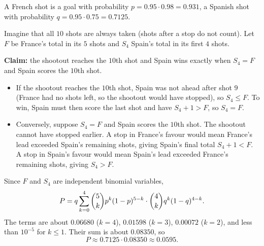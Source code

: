 A French shot is a goal with probability $p=0.95\cdot0.98=0.931$, a Spanish shot with probability $q=0.95\cdot0.75=0.7125$.

Imagine that all $10$ shots are always taken (shots after a stop do not count). Let $F$ be France's total in its $5$ shots and $S_4$ Spain's total in its first $4$ shots.

\textbf{Claim:} the shootout reaches the $10$th shot and Spain wins exactly when $S_4=F$ and Spain scores the $10$th shot.
\begin{itemize}
\item If the shootout reaches the $10$th shot, Spain was not ahead after shot $9$ (France had no shots left, so the shootout would have stopped), so $S_4\le F$. To win, Spain must then score the last shot and have $S_4+1>F$, so $S_4=F$.
\item Conversely, suppose $S_4=F$ and Spain scores the $10$th shot. The shootout cannot have stopped earlier. A stop in France's favour would mean France's lead exceeded Spain's remaining shots, giving Spain's final total $S_4+1<F$. A stop in Spain's favour would mean Spain's lead exceeded France's remaining shots, giving $S_4>F$.
\end{itemize}

Since $F$ and $S_4$ are independent binomial variables,
\[P=q\sum_{k=0}^{4}\dbinom5kp^k(1-p)^{5-k}\cdot\dbinom4kq^k(1-q)^{4-k}.\]
The terms are about $0.06680$ ($k=4$), $0.01598$ ($k=3$), $0.00072$ ($k=2$), and less than $10^{-5}$ for $k\le1$. Their sum is about $0.08350$, so
\[P\approx0.7125\cdot0.08350\approx\boxed{0.0595}.\]
